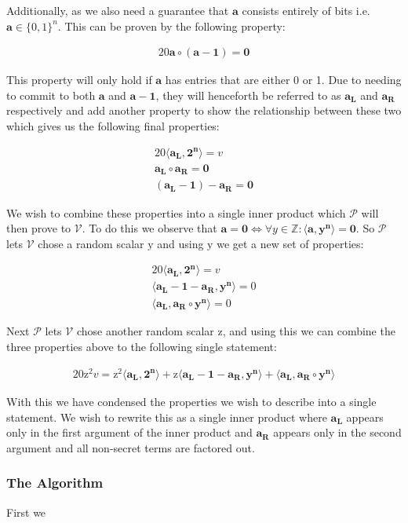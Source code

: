 \documentclass{article}
\newcommand{\eq}[1]{\begin{alignat*}{20}#1\end{alignat*}}
\renewcommand{\vec}[1]{\boldsymbol{#1}}
\newcommand{\ran}[1]{\mathrm{#1}}
\newcommand{\vecran}[1]{\mathbf{#1}}
\newcommand{\V}{\mathcal{V}}
\renewcommand{\P}{\mathcal{P}}
\newcommand{\dotp}[2]{\langle #1, #2 \rangle}
\newcommand{\opn}[1]{\operatorname{#1}}
\newcommand{\vecl}[1]{\vec{#1_{\opn{L}}}}
\newcommand{\vecr}[1]{\vec{#1_{\opn{R}}}}
\begin{document}
Additionally, as we also need a guarantee that $\vec{a}$ consists
entirely of bits i.e. $\vec{a} \in \{0,1\}^n$. This can be
proven by the following property:

\eq{\vec{a}\circ (\vec{a} - \vec{1}) = \vec{0}}

This property will only hold if $\vec{a}$ has entries that are either
0 or 1. Due to needing to commit to both $\vec{a}$ and $\vec{a}
- \vec{1}$, they will henceforth be referred to as $\vecl{a}$
and $\vecr{a}$ respectively and add another property to show the
relationship between these two which gives us the following final
properties:

\eq{
	\dotp{\vecl{a}}{\vec{2^n}} = v \\
	\vecl{a}\circ \vecr{a} = \vec{0} \\
	(\vecl{a} - \vec{1}) - \vecr{a} = \vec{0}
}

We wish to combine these properties into a single inner product which
$\P$ will then prove to $\V$. To do this we observe that $\vec{a}
= \vec{0} \iff \forall y\in\mathbb{Z}: \dotp{\vec{a}}{\vec{y^n}} =
\vec{0}$. So $\P$ lets $\V$ chose a random scalar $\ran{y}$ and using
$\ran{y}$ we get a new set of properties:

\eq{
	\dotp{\vecl{a}}{\vec{2^n}} = v \\
	\dotp{\vecl{a} - \vec{1} - \vecr{a}}{\vecran{y^n}} = 0 \\
	\dotp{\vecl{a}}{\vecr{a}\circ \vecran{y^n}} = 0
}

Next $\P$ lets $\V$ chose another random scalar $\ran{z}$, and using
this we can combine the three properties above to the following single
statement:

\eq{
	\ran{z^2}v = 
	\ran{z^2}\dotp{\vecl{a}}{\vec{2^n}} +
	\ran{z}\dotp{\vecl{a} - \vec{1} - \vecr{a}}{\vecran{y^n}} +
	\dotp{\vecl{a}}{\vecr{a}\circ \vecran{y^n}}
}

With this we have condensed the properties we wish to describe into
a single statement. We wish to rewrite this as a single inner product
where $\vecl{a}$ appears only in the first argument of the inner product
and $\vecr{a}$ appears only in the second argument and all non-secret
terms are factored out.

\subsubsection{The Algorithm}First we 
\end{document}
